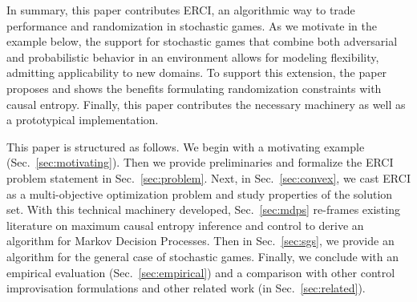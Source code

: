 %
In summary, this paper contributes ERCI, an algorithmic way to trade
performance and randomization in stochastic games. As we motivate in the example below, the support for stochastic games that combine both
adversarial and probabilistic behavior in an environment allows for
modeling flexibility, admitting applicability to new domains. To
support this extension, the paper proposes and shows the benefits
formulating randomization constraints with causal entropy.  Finally,
this paper contributes the necessary machinery as well as a
prototypical implementation.

 This paper is structured as follows. We begin
with a motivating example (Sec.~\ref{sec:motivating}). Then we
provide preliminaries and formalize the ERCI problem statement in
Sec.~\ref{sec:problem}. Next, in Sec.~\ref{sec:convex}, we cast ERCI
as a multi-objective optimization problem and study properties of the
solution set. With this technical machinery developed,
Sec.~\ref{sec:mdps} re-frames existing literature on maximum causal
entropy inference and control to derive an algorithm for Markov
Decision Processes.  Then in Sec.~\ref{sec:sgs}, we provide an
algorithm for the general case of stochastic games. Finally, we
conclude with an empirical evaluation (Sec.~\ref{sec:empirical}) and a
comparison with other control improvisation formulations and other
related work (in Sec.~\ref{sec:related}).



